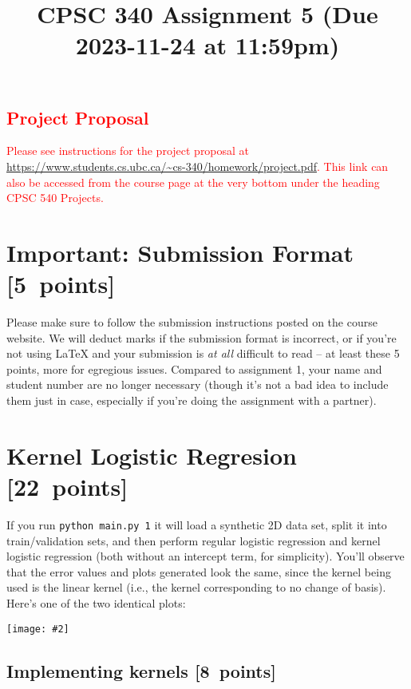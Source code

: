 \documentclass{article}
\newcommand{\blu}[1]{{\textcolor{blu}{#1}}}
\newcommand{\red}[1]{\textcolor{red}{#1}}
\let\ask\blu
\newcommand\pts[1]{\textcolor{pointscolour}{[#1~points]}}
\newcommand{\centerfig}[2]{\begin{center}\texttt{[image: \#2]}\end{center}}
\begin{document}
\title{CPSC 340 Assignment 5 (Due 2023-11-24 at 11:59pm)}
\author{}
\date{}
\maketitle
\vspace{-6em}

\red{
\section*{Project Proposal}
Please see instructions for the project proposal at \url{https://www.students.cs.ubc.ca/~cs-340/homework/project.pdf}. This link can also be accessed from the course page at the very bottom under the heading CPSC 540 Projects.
}

\section*{Important: Submission Format \pts{5}}

Please make sure to follow the submission instructions posted on the course website.
\ask{We will deduct marks if the submission format is incorrect, or if you're not using \LaTeX{} and your submission is \emph{at all} difficult to read} -- at least these 5 points, more for egregious issues.
Compared to assignment 1, your name and student number are no longer necessary (though it's not a bad idea to include them just in case, especially if you're doing the assignment with a partner).

\vspace{1em}



\section{Kernel Logistic Regresion \pts{22}}

If you run \verb|python main.py 1| it will load a synthetic 2D data set, split it into train/validation sets, and then perform regular logistic regression and kernel logistic regression (both without an intercept term, for simplicity). You'll observe that the error values and plots generated look the same, since the kernel being used is the linear kernel (i.e., the kernel corresponding to no change of basis). Here's one of the two identical plots:
\centerfig{0.5}{figs/logReg.png}


\subsection{Implementing kernels \pts{8}}
\end{document}
